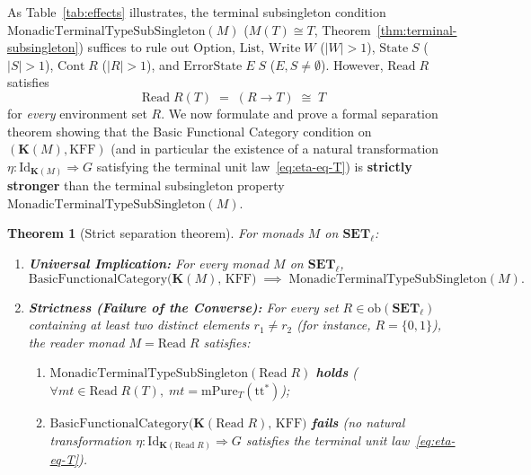\documentclass[11pt,a4paper]{article}
\newtheorem{theorem}{Theorem}[section]
\theoremstyle{definition}
\theoremstyle{remark}
\newcommand{\Set}{\mathbf{SET}}
\newcommand{\Id}{\mathrm{Id}}
\newcommand{\KFF}{\mathrm{KFF}}
\newcommand{\K}{\mathbf{K}}
\newcommand{\ttstar}{\mathrm{tt}^*}
\begin{document}
As Table~\ref{tab:effects} illustrates, the terminal subsingleton condition
$\mathrm{MonadicTerminalTypeSubSingleton}(M)$ ($M(T) \cong T$, Theorem~\ref{thm:terminal-subsingleton})
suffices to rule out $\mathrm{Option}$, $\mathrm{List}$, $\mathrm{Write}\;W$ ($|W| > 1$),
$\mathrm{State}\;S$ ($|S| > 1$), $\mathrm{Cont}\;R$ ($|R| > 1$), and $\mathrm{ErrorState}\;E\;S$
($E, S \neq \emptyset$). However, $\mathrm{Read}\;R$ satisfies
\[
  \mathrm{Read}\;R(T) \;=\; (R \to T) \;\cong\; T
\]
for \emph{every} environment set $R$. We now formulate and prove a formal separation theorem showing
that the Basic Functional Category condition on $(\K(M), \KFF)$ (and in particular the existence of a
natural transformation $\eta : \Id_{\K(M)} \Rightarrow G$ satisfying the terminal unit
law~\eqref{eq:eta-eq-T}) is \textbf{strictly stronger} than the terminal subsingleton property
$\mathrm{MonadicTerminalTypeSubSingleton}(M)$.

\begin{theorem}[Strict separation theorem]\label{thm:strict-separation}
For monads $M$ on $\Set_\ell$:
\begin{enumerate}[label=(\roman*),nosep]
  \item \textbf{Universal Implication:} For every monad $M$ on $\Set_\ell$,
  \[
    \mathrm{BasicFunctionalCategory}\bigl(\K(M),\, \KFF\bigr)
    \;\implies\;
    \mathrm{MonadicTerminalTypeSubSingleton}(M).
  \]
\vspace{4 pt}
  \item \textbf{Strictness (Failure of the Converse):} For every set $R \in \mathrm{ob}(\Set_\ell)$
  containing at least two distinct elements $r_1 \neq r_2$ (for instance, $R = \{0, 1\}$), the reader
  monad $M = \mathrm{Read}\;R$ satisfies:
  \begin{enumerate}[label=(\alph*),nosep]
    \item $\mathrm{MonadicTerminalTypeSubSingleton}(\mathrm{Read}\;R)$ \textbf{holds} ($\forall mt \in
    \mathrm{Read}\;R(T),\; mt = \mathrm{mPure}_T(\ttstar)$);
\vspace{4 pt}
    \item $\mathrm{BasicFunctionalCategory}\bigl(\K(\mathrm{Read}\;R),\, \KFF\bigr)$ \textbf{fails}
    (no natural transformation $\eta : \Id_{\K(\mathrm{Read}\;R)} \Rightarrow G$ satisfies the terminal
    unit law~\eqref{eq:eta-eq-T}).
  \end{enumerate}
\end{enumerate}
\end{theorem}
\end{document}
